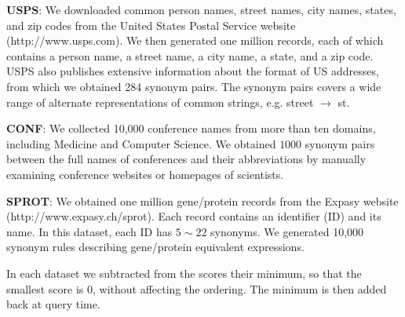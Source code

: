 \documentclass{sig-alternate}
\begin{document}
\smallskip
\noindent \textbf{{USPS}}: We downloaded common person names, street names,
city names, states, and zip codes from the United States Postal
Service website ({\footnotesize http://www.usps.com}). We then generated
one million records, each of which contains a person name, a street
name, a city name, a state, and a zip code. USPS also publishes
extensive information about the format of US addresses, from which we
obtained 284 synonym pairs. The synonym pairs covers a wide range of alternate
representations of common strings, e.g. street $\rightarrow$ st.


\noindent \textbf{{CONF}}: We collected 10,000 conference names
from more than ten domains, including Medicine and Computer
Science.
We obtained $1000$ synonym pairs between the full names of conferences and their
abbreviations by manually examining conference websites or homepages
of scientists.


\noindent \textbf{{SPROT}}: We obtained one million gene/protein records
from the Expasy website ({\footnotesize http://www.expasy.ch/sprot}).
Each record contains an identifier (ID) and its name.
In this dataset, each ID has $5\sim22$ synonyms. We generated 10,000 synonym rules describing gene/protein
equivalent expressions.

In each dataset we subtracted from the scores their minimum,
so that the smallest score is 0, without affecting the
ordering. The minimum is then added back at query time.
\end{document}
